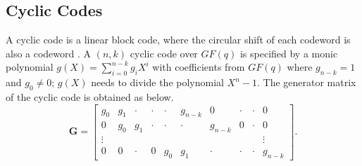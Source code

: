 \documentclass[journal,twocolumn]{IEEEtran}
\theoremstyle{definition}
\newcommand{\bfG}{\mathbf{G}}
\begin{document}
\subsection{Cyclic Codes}
     A cyclic code is a linear block code, where the circular shift of each codeword is also a codeword \cite{lincostello}. A $(n,k)$ cyclic code over $GF(q)$ is specified by a monic polynomial $g(X) = \sum_{i=0}^{n-k} g_i X^i$ with coefficients from $GF(q)$ where $g_{n-k} = 1$ and $g_0 \neq 0$; $g(X)$ needs to divide the polynomial $X^n-1$. The generator matrix of the cyclic code is obtained as below.
     $$
     \bfG=\begin{bmatrix}
     g_0&g_1&\cdot&\cdot&\cdot&g_{n-k}&0&\cdot&\cdot&0\\
     0&g_0&g_1&\cdot&\cdot&\cdot&g_{n-k}&0&\cdot&0\\
     \vdots&&&&&&&&&\vdots\\
     0&0&\cdot&0&g_0&g_1&\cdot&\cdot&\cdot&g_{n-k}
     \end{bmatrix}.
     $$

\end{document}
